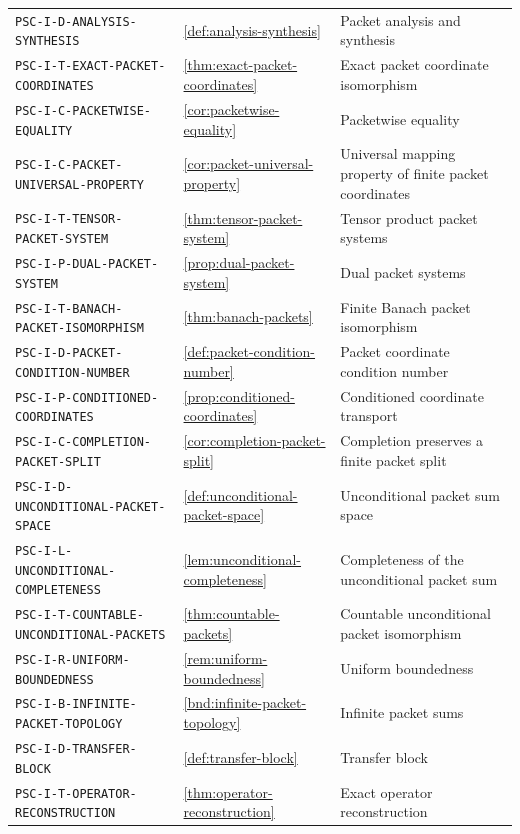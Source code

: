 \begin{longtable}{@{}p{}p{}p{}@{}}
\nolinkurl{PSC-I-D-ANALYSIS-SYNTHESIS} & \ref{def:analysis-synthesis} & Packet analysis and synthesis \\
\nolinkurl{PSC-I-T-EXACT-PACKET-COORDINATES} & \ref{thm:exact-packet-coordinates} & Exact packet coordinate isomorphism \\
\nolinkurl{PSC-I-C-PACKETWISE-EQUALITY} & \ref{cor:packetwise-equality} & Packetwise equality \\
\nolinkurl{PSC-I-C-PACKET-UNIVERSAL-PROPERTY} & \ref{cor:packet-universal-property} & Universal mapping property of finite packet coordinates \\
\nolinkurl{PSC-I-T-TENSOR-PACKET-SYSTEM} & \ref{thm:tensor-packet-system} & Tensor product packet systems \\
\nolinkurl{PSC-I-P-DUAL-PACKET-SYSTEM} & \ref{prop:dual-packet-system} & Dual packet systems \\
\nolinkurl{PSC-I-T-BANACH-PACKET-ISOMORPHISM} & \ref{thm:banach-packets} & Finite Banach packet isomorphism \\
\nolinkurl{PSC-I-D-PACKET-CONDITION-NUMBER} & \ref{def:packet-condition-number} & Packet coordinate condition number \\
\nolinkurl{PSC-I-P-CONDITIONED-COORDINATES} & \ref{prop:conditioned-coordinates} & Conditioned coordinate transport \\
\nolinkurl{PSC-I-C-COMPLETION-PACKET-SPLIT} & \ref{cor:completion-packet-split} & Completion preserves a finite packet split \\
\nolinkurl{PSC-I-D-UNCONDITIONAL-PACKET-SPACE} & \ref{def:unconditional-packet-space} & Unconditional packet sum space \\
\nolinkurl{PSC-I-L-UNCONDITIONAL-COMPLETENESS} & \ref{lem:unconditional-completeness} & Completeness of the unconditional packet sum \\
\nolinkurl{PSC-I-T-COUNTABLE-UNCONDITIONAL-PACKETS} & \ref{thm:countable-packets} & Countable unconditional packet isomorphism \\
\nolinkurl{PSC-I-R-UNIFORM-BOUNDEDNESS} & \ref{rem:uniform-boundedness} & Uniform boundedness \\
\nolinkurl{PSC-I-B-INFINITE-PACKET-TOPOLOGY} & \ref{bnd:infinite-packet-topology} & Infinite packet sums \\
\nolinkurl{PSC-I-D-TRANSFER-BLOCK} & \ref{def:transfer-block} & Transfer block \\
\nolinkurl{PSC-I-T-OPERATOR-RECONSTRUCTION} & \ref{thm:operator-reconstruction} & Exact operator reconstruction \\

\end{longtable}
